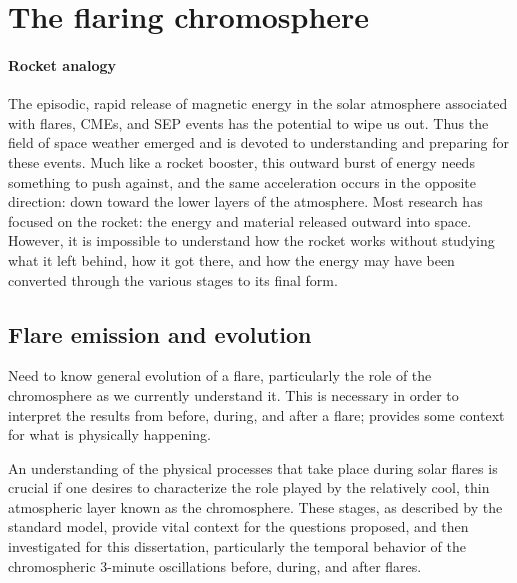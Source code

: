 
\section{The flaring chromosphere}



\paragraph{Rocket analogy}
The episodic, rapid release of magnetic energy in the solar atmosphere
associated with flares, CMEs, and SEP events has the potential to wipe us out.
Thus the field of space weather emerged and is devoted to understanding and
preparing for these events. Much like a rocket booster, this outward burst of
energy needs something to push against, and the same acceleration occurs in the
opposite direction: down toward the lower layers of the atmosphere. Most
research has focused on the rocket: the energy and material released outward
into space. However, it is impossible to understand how the rocket works
without studying what it left behind, how it got there, and how the energy may
have been converted through the various stages to its final form.



\subsection{Flare emission and evolution}

Need to know general evolution of a flare, particularly the role of the
chromosphere as we currently understand it.
This is necessary in order
to interpret the results from before, during, and after a flare;
provides some context for what is physically happening.

An understanding of the physical processes that take place
during solar flares
is crucial if one desires to characterize the role played by the
relatively cool, thin atmospheric layer known as the chromosphere.
These stages, as described by the standard model,
provide vital context for the questions proposed, and then
investigated for this dissertation,
particularly the temporal behavior
of the chromospheric 3-minute oscillations before, during, and after flares.

